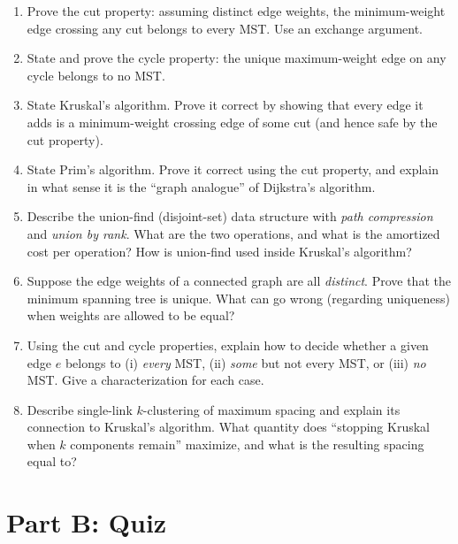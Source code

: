 \documentclass[11pt]{article}
\begin{document}
\begin{enumerate}[label=\textbf{A\arabic*.}, leftmargin=2.2em]
\item Prove the cut property: assuming distinct edge weights, the minimum-weight
edge crossing any cut belongs to every MST. Use an exchange argument.

\item State and prove the cycle property: the unique maximum-weight edge on any
cycle belongs to no MST.

\item State Kruskal's algorithm. Prove it correct by showing that every edge it
adds is a minimum-weight crossing edge of some cut (and hence safe by the cut
property).

\item State Prim's algorithm. Prove it correct using the cut property, and
explain in what sense it is the ``graph analogue'' of Dijkstra's algorithm.

\item Describe the union-find (disjoint-set) data structure with \emph{path
compression} and \emph{union by rank}. What are the two operations, and what is
the amortized cost per operation? How is union-find used inside Kruskal's
algorithm?

\item Suppose the edge weights of a connected graph are all \emph{distinct}.
Prove that the minimum spanning tree is unique. What can go wrong (regarding
uniqueness) when weights are allowed to be equal?

\item Using the cut and cycle properties, explain how to decide whether a given
edge $e$ belongs to (i) \emph{every} MST, (ii) \emph{some} but not every MST, or
(iii) \emph{no} MST. Give a characterization for each case.

\item Describe single-link $k$-clustering of maximum spacing and explain its
connection to Kruskal's algorithm. What quantity does ``stopping Kruskal when $k$
components remain'' maximize, and what is the resulting spacing equal to?

\end{enumerate}

\newpage
\section*{Part B: Quiz}
\end{document}
